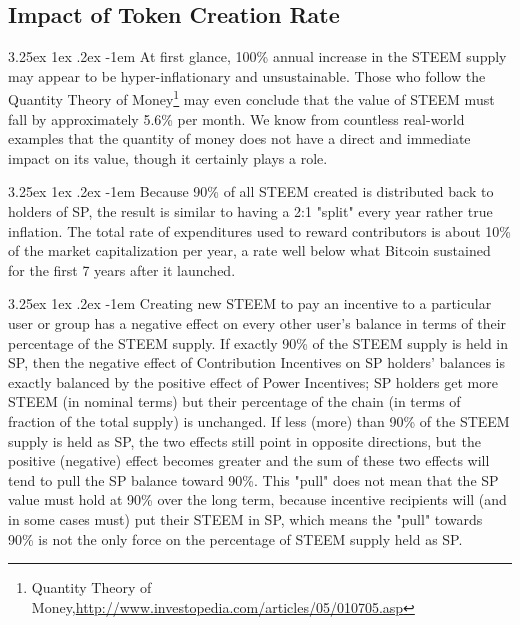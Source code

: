 \documentclass{article}
\makeatletter
\renewcommand\paragraph{\@startsection{paragraph}{5}{\z@}%
  {3.25ex \@plus1ex \@minus.2ex}%
  {-1em}%
  {\normalfont\normalsize\bfseries}}
\makeatother
\begin{document}
        \subsection{Impact of Token Creation Rate}

            \paragraph{}
                At first glance, 100\% annual increase in the STEEM supply may appear to be hyper-inflationary and unsustainable. Those who follow the Quantity Theory of Money\footnote{Quantity Theory of Money,\newline\url{http://www.investopedia.com/articles/05/010705.asp}} may even conclude that the value of STEEM must fall by approximately 5.6\% per month. We know from countless real-world examples that the quantity of money does not have a direct and immediate impact on its value, though it certainly plays a role.

            \paragraph{}
                Because 90\% of all STEEM created is distributed back to holders of SP, the result is similar to having a 2:1 "split" every year rather true inflation. The total rate of expenditures used to reward contributors is about 10\% of the market capitalization per year, a rate well below what Bitcoin sustained for the first 7 years after it launched.

            \paragraph{}
                Creating new STEEM to pay an incentive to a particular user or group has a negative effect on every other user's balance in terms of their percentage of the STEEM supply. If exactly 90\% of the STEEM supply is held in SP, then the negative effect of Contribution Incentives on SP holders' balances is exactly balanced by the positive effect of Power Incentives; SP holders get more STEEM (in nominal terms) but their percentage of the chain (in terms of fraction of the total supply) is unchanged. If less (more) than 90\% of the STEEM supply is held as SP, the two effects still point in opposite directions, but the positive (negative) effect becomes greater and the sum of these two effects will tend to pull the SP balance toward 90\%. This "pull" does not mean that the SP value must hold at 90\% over the long term, because incentive recipients will (and in some cases must) put their STEEM in SP, which means the "pull" towards 90\% is not the only force on the percentage of STEEM supply held as SP.
\end{document}
